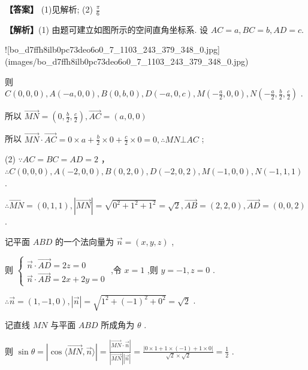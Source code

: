 \documentclass[10pt]{article}
\begin{document}
\textbf{【答案】} (1)见解析; (2) \(\frac{\pi }{6}\)

\textbf{【解析】}(1) 由题可建立如图所示的空间直角坐标系. 设 \({AC} = a,{BC} = b,{AD} = c.\)

![bo_d7ffh8ilb0pc73deo6o0_7_1103_243_379_348_0.jpg](images/bo_d7ffh8ilb0pc73deo6o0_7_1103_243_379_348_0.jpg)

则 \(C\left( {0,0,0}\right) , A\left( {-a,0,0}\right) , B\left( {0, b,0}\right) , D\left( {-a,0, c}\right) , M\left( {-\frac{a}{2},0,0}\right) , N\left( {-\frac{a}{2},\frac{b}{2},\frac{c}{2}}\right)\) .

所以 \(\overrightarrow{MN} = \left( {0,\frac{b}{2},\frac{c}{2}}\right) ,\overrightarrow{AC} = \left( {a,0,0}\right)\)

所以 \(\overrightarrow{MN} \cdot  \overrightarrow{AC} = 0 \times  a + \frac{b}{2} \times  0 + \frac{c}{2} \times  0 = 0,\therefore {MN} \bot  {AC}\) ;

(2) \(\because {AC} = {BC} = {AD} = 2\) ， \(\therefore C\left( {0,0,0}\right) , A\left( {-2,0,0}\right) , B\left( {0,2,0}\right) , D\left( {-2,0,2}\right) , M\left( {-1,0,0}\right) , N\left( {-1,1,1}\right)\) .

\(\therefore \overrightarrow{MN} = \left( {0,1,1}\right) ,\left| \overrightarrow{MN}\right|  = \sqrt{{0}^{2} + {1}^{2} + {1}^{2}} = \sqrt{2},\overrightarrow{AB} = \left( {2,2,0}\right) ,\overrightarrow{AD} = \left( {0,0,2}\right)\) .

记平面 \({ABD}\) 的一个法向量为 \(\overrightarrow{n} = \left( {x, y, z}\right)\) ,

则 \(\left\{  \begin{matrix} \overrightarrow{n} \cdot  \overrightarrow{AD} = {2z} = 0 \\  \overrightarrow{n} \cdot  \overrightarrow{AB} = {2x} + {2y} = 0 \end{matrix}\right.\) ,令 \(x = 1\) ,则 \(y =  - 1, z = 0\) .

\(\therefore \overrightarrow{n} = \left( {1, - 1,0}\right) ,\left| \overrightarrow{n}\right|  = \sqrt{{1}^{2} + {\left( -1\right) }^{2} + {0}^{2}} = \sqrt{2}\) .

记直线 \({MN}\) 与平面 \({ABD}\) 所成角为 \(\theta\) .

则 \(\sin \theta  = \left| {\cos \langle \overrightarrow{MN},\overrightarrow{n}\rangle }\right|  = \frac{\left| \overrightarrow{MN} \cdot  \overrightarrow{n}\right| }{\left| \overrightarrow{MN}\right| \left| \overrightarrow{n}\right| } = \frac{\left| 0 \times  1 + 1 \times  \left( -1\right)  + 1 \times  0\right| }{\sqrt{2} \times  \sqrt{2}} = \frac{1}{2}\) .
\end{document}
